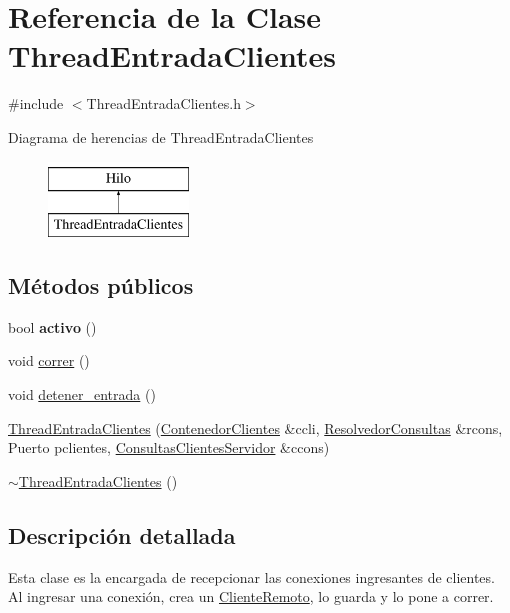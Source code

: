 \hypertarget{classThreadEntradaClientes}{\section{\-Referencia de la \-Clase \-Thread\-Entrada\-Clientes}
\label{classThreadEntradaClientes}
}


{\ttfamily \#include $<$\-Thread\-Entrada\-Clientes.\-h$>$}

\-Diagrama de herencias de \-Thread\-Entrada\-Clientes\begin{figure}[H]
\begin{center}
\leavevmode
\includegraphics[height=2.000000cm]{classThreadEntradaClientes}
\end{center}
\end{figure}
\subsection*{\-Métodos públicos}
\begin{DoxyCompactItemize}
\item 
\hypertarget{classThreadEntradaClientes_a692fe949b862c175ac2d32a9cab7ad09}{bool {\bfseries activo} ()}\label{classThreadEntradaClientes_a692fe949b862c175ac2d32a9cab7ad09}

\item 
void \hyperlink{classThreadEntradaClientes_ac029f0388d0469d1767db3d8b86247f4}{correr} ()
\item 
void \hyperlink{classThreadEntradaClientes_a1940d4b58580d9ae6f8a68a9cf920e0c}{detener\-\_\-entrada} ()
\item 
\hyperlink{classThreadEntradaClientes_af35304a49537e966afadae04c637654c}{\-Thread\-Entrada\-Clientes} (\hyperlink{classContenedorClientes}{\-Contenedor\-Clientes} \&ccli, \hyperlink{classResolvedorConsultas}{\-Resolvedor\-Consultas} \&rcons, \-Puerto pclientes, \hyperlink{classBLQueue}{\-Consultas\-Clientes\-Servidor} \&ccons)
\item 
\hyperlink{classThreadEntradaClientes_a13ab382efe053647dd2407d5b6212a07}{$\sim$\-Thread\-Entrada\-Clientes} ()
\end{DoxyCompactItemize}


\subsection{\-Descripción detallada}
\-Esta clase es la encargada de recepcionar las conexiones ingresantes de clientes. \-Al ingresar una conexión, crea un \hyperlink{classClienteRemoto}{\-Cliente\-Remoto}, lo guarda y lo pone a correr. 

